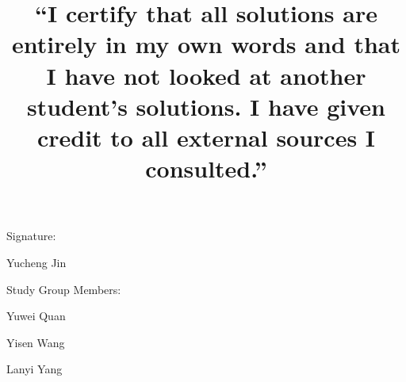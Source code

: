 \documentclass[11pt]{article}
\begin{document}
\title{“I certify that all solutions are entirely in my own words and that I have not looked at another student’s solutions. I have given credit to all external sources I consulted.”}
\maketitle
\vspace*{\fill}
    \begin{center}
 \large{Signature:}
\item 
Yucheng Jin   
\item
\item
Study Group Members:
\item
Yuwei Quan
\item
Yisen Wang
\item
Lanyi Yang
\item
    \end{center}
\vspace*{\fill}

\end{document}
